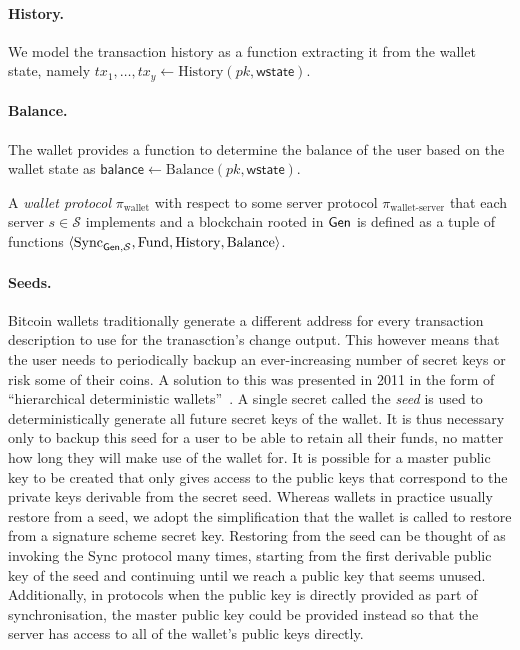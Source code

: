 \paragraph{History.}
We model the transaction history as a function extracting it from the wallet state, namely $tx_1, \dots, tx_y \gets \text{History}(pk, \textsf{wstate})$.

\paragraph{Balance.}
The wallet provides a function to determine the balance of the user based on the wallet state as $\textsf{balance} \gets \text{Balance}(pk, \textsf{wstate})$.

\begin{definition}
A \emph{wallet protocol} $\pi_\text{wallet}$ with respect to some server protocol $\pi_\text{wallet-server}$ that each server $s \in \mathcal{S}$ implements and a blockchain rooted in $\textsf{Gen}$ is defined as a tuple of functions $\langle\text{Sync}_{\textsf{Gen}, \mathcal{S}}, \text{Fund}, \text{History}, \text{Balance}\rangle$.
\end{definition}

\paragraph{Seeds.}
Bitcoin wallets traditionally generate a different address for every transaction description to use for the tranasction's change output. This however means that the user needs to periodically backup an ever-increasing number of secret keys or risk some of their coins. A solution to this was presented in 2011 in the form of ``hierarchical deterministic wallets''~\cite{first-deterministic,bip32}. A single secret called the \emph{seed} is used to deterministically generate all future secret keys of the wallet. It is thus necessary only to backup this seed for a user to be able to retain all their funds, no matter how long they will make use of the wallet for. It is possible for a master public key to be created that only gives access to the public keys that correspond to the private keys derivable from the secret seed. Whereas wallets in practice usually restore from a seed, we adopt the simplification that the wallet is called to restore from a signature scheme secret key. Restoring from the seed can be thought of as invoking the Sync protocol many times, starting from the first derivable public key of the seed and continuing until we reach a public key that seems unused. Additionally, in protocols when the public key is directly provided as part of synchronisation, the master public key could be provided instead so that the server has access to all of the wallet's public keys directly.
